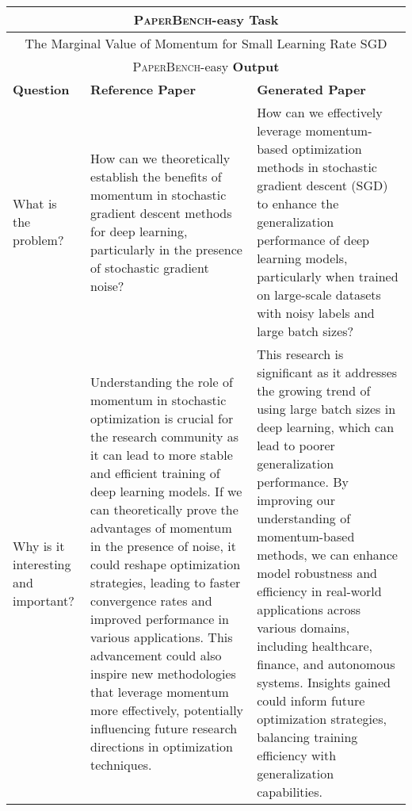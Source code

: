 \begin{table*}[htbp]
\centering
\scriptsize
\begin{tabular}{p{3cm}p{6cm}p{6cm}}
\toprule[1.1pt]
\multicolumn{3}{c}{\textsc{PaperBench}-easy \textbf{Task}} \\ \midrule
\multicolumn{3}{c}{The Marginal Value of Momentum for Small Learning Rate SGD} \\ \midrule
\multicolumn{3}{c}{\textsc{PaperBench}-easy \textbf{Output}} \\ \midrule
\textbf{Question} & \textbf{Reference Paper} & \textbf{Generated Paper} \\ \midrule
What is the problem? & 
How can we theoretically establish the benefits of momentum in stochastic gradient descent methods for deep learning, particularly in the presence of stochastic gradient noise? &
How can we effectively leverage momentum-based optimization methods in stochastic gradient descent (SGD) to enhance the generalization performance of deep learning models, particularly when trained on large-scale datasets with noisy labels and large batch sizes? \\ \midrule

Why is it interesting and important? & 
Understanding the role of momentum in stochastic optimization is crucial for the research community as it can lead to more stable and efficient training of deep learning models. If we can theoretically prove the advantages of momentum in the presence of noise, it could reshape optimization strategies, leading to faster convergence rates and improved performance in various applications. This advancement could also inspire new methodologies that leverage momentum more effectively, potentially influencing future research directions in optimization techniques. &
This research is significant as it addresses the growing trend of using large batch sizes in deep learning, which can lead to poorer generalization performance. By improving our understanding of momentum-based methods, we can enhance model robustness and efficiency in real-world applications across various domains, including healthcare, finance, and autonomous systems. Insights gained could inform future optimization strategies, balancing training efficiency with generalization capabilities.
\\ \midrule


\end{tabular}
\end{table*}
